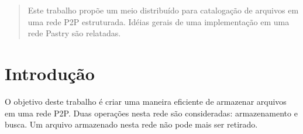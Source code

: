 \documentclass{acm_proc_article-sp}
\begin{document}
%
\author{
%
%
\alignauthor
Antonio Carlos S. Furtado Jr.\\
       \\
       \\
\alignauthor
Roger Roberto R. Duarte\\
       \\
       \\
\alignauthor Tiago Rodrigo Kepe\\
       \\
       \\
}
\maketitle
\begin{abstract}
Este trabalho propõe um meio distribuído para catalogação de arquivos em uma rede P2P estruturada. Idéias gerais de uma implementação em uma rede Pastry são relatadas.
\end{abstract}



\section{Introdução}

O objetivo deste trabalho é criar uma maneira eficiente de armazenar arquivos em uma rede P2P. Duas operações nesta rede são consideradas: armazenamento e busca. Um arquivo armazenado nesta rede não pode mais ser retirado. 
\end{document}
